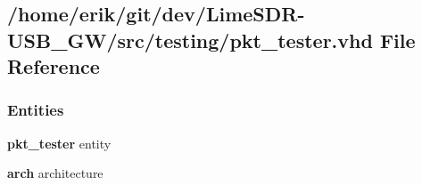 \subsection{/home/erik/git/dev/\+Lime\+S\+D\+R-\/\+U\+S\+B\+\_\+\+G\+W/src/testing/pkt\+\_\+tester.vhd File Reference}
\label{pkt__tester_8vhd}
\subsubsection*{Entities}
\begin{DoxyCompactItemize}
\item 
{\bf pkt\+\_\+tester} entity
\item 
{\bf arch} architecture
\end{DoxyCompactItemize}
